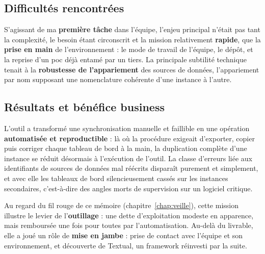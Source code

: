 \subsection{Difficultés rencontrées}
S'agissant de ma \textbf{première tâche} dans l'équipe, l'enjeu principal n'était
pas tant la complexité, le besoin étant circonscrit et la mission relativement
\textbf{rapide}, que la \textbf{prise en main} de l'environnement : le mode de
travail de l'équipe, le dépôt, et la reprise d'un \gls{poc} déjà entamé par un
tiers. La principale subtilité technique tenait à la \textbf{robustesse de
l'appariement} des sources de données, l'appariement par nom supposant une
nomenclature cohérente d'une instance à l'autre.

\subsection{Résultats et bénéfice business}
L'outil a transformé une synchronisation manuelle et faillible en une opération
\textbf{automatisée et reproductible} : là où la procédure exigeait d'exporter,
copier puis corriger chaque tableau de bord à la main, la duplication complète
d'une instance se réduit désormais à l'exécution de l'outil. La classe
d'erreurs liée aux identifiants de sources de données mal réécrits disparaît
purement et simplement, et avec elle les tableaux de bord silencieusement
cassés sur les instances secondaires, c'est-à-dire des angles morts de
supervision sur un logiciel critique.

Au regard du fil rouge de ce mémoire (chapitre~\ref{chap:veille}), cette
mission illustre le levier de l'\textbf{outillage} : une dette d'exploitation
modeste en apparence, mais remboursée une fois pour toutes par
l'automatisation. Au-delà du livrable, elle a joué un rôle de \textbf{mise en
jambe} : prise de contact avec l'équipe et son environnement, et découverte
de Textual, un framework réinvesti par la suite.
